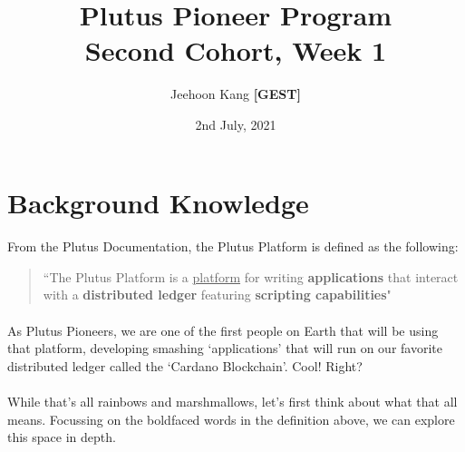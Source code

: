 \documentclass[a4paper, 11pt]{article}
\title{Plutus Pioneer Program \\ \large Second Cohort, Week 1}
\date{2nd July, 2021}
\author{Jeehoon Kang \textbf{[GEST]}}
\begin{document}
    \maketitle

    \section{Background Knowledge}

    \paragraph{} From the Plutus Documentation, the Plutus Platform is defined as the following: 

    \begin{quotation}
        ``The Plutus Platform is a \underline{platform} for writing \textbf{applications} that interact with a \textbf{distributed ledger} featuring \textbf{scripting capabilities}"
    \end{quotation}

    \paragraph{}As Plutus Pioneers, we are one of the first people on Earth that will be using that platform, developing smashing `applications' that will run on our favorite distributed ledger called the `Cardano Blockchain'. Cool! Right?
    
    \paragraph{} While that's all rainbows and marshmallows, let's first think about what that all means. Focussing on the boldfaced words in the definition above, we can explore this space in depth.
\end{document}
